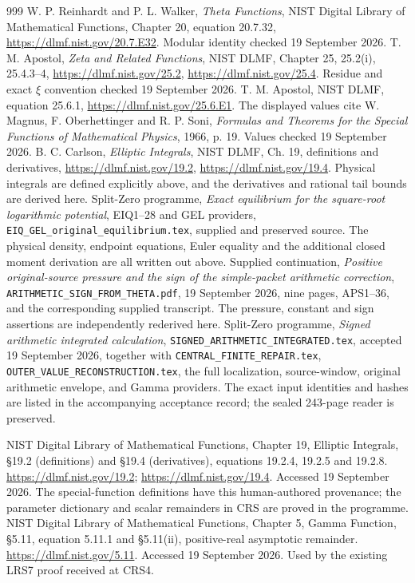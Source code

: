 \documentclass[11pt,a4paper]{article}
\begin{document}
\begin{thebibliography}{999}
 W. P. Reinhardt and P. L. Walker,
\emph{Theta Functions}, NIST Digital Library of Mathematical Functions,
Chapter 20, equation 20.7.32,
\url{https://dlmf.nist.gov/20.7.E32}. Modular identity checked 19 September 2026.
 T. M. Apostol, \emph{Zeta and Related Functions}, NIST DLMF,
Chapter 25, 25.2(i), 25.4.3--4,
\url{https://dlmf.nist.gov/25.2}, \url{https://dlmf.nist.gov/25.4}.
Residue and exact $\xi$ convention checked 19 September 2026.
 T. M. Apostol, NIST DLMF, equation 25.6.1,
\url{https://dlmf.nist.gov/25.6.E1}. The displayed values cite
W. Magnus, F. Oberhettinger and R. P. Soni,
\emph{Formulas and Theorems for the Special Functions of Mathematical Physics},
1966, p. 19. Values checked 19 September 2026.
 B. C. Carlson, \emph{Elliptic Integrals}, NIST DLMF,
Ch. 19, definitions and derivatives, \url{https://dlmf.nist.gov/19.2},
\url{https://dlmf.nist.gov/19.4}. Physical integrals are defined explicitly
above, and the derivatives and rational tail bounds are derived here.
 Split-Zero programme, \emph{Exact equilibrium for the
square-root logarithmic potential}, EIQ1--28 and GEL providers,
\texttt{EIQ\_GEL\_original\_equilibrium.tex}, supplied and preserved source.
The physical density, endpoint equations, Euler equality and the
additional closed moment derivation are all written out above.
 Supplied continuation, \emph{Positive original-source
pressure and the sign of the simple-packet arithmetic correction},
\texttt{ARITHMETIC\_SIGN\_FROM\_THETA.pdf}, 19 September 2026, nine pages,
APS1--36, and the corresponding supplied transcript. The pressure,
constant and sign assertions are independently rederived here.
 Split-Zero programme, \emph{Signed arithmetic integrated
calculation}, \texttt{SIGNED\_ARITHMETIC\_INTEGRATED.tex}, accepted
19 September 2026, together with \texttt{CENTRAL\_FINITE\_REPAIR.tex},
\texttt{OUTER\_VALUE\_RECONSTRUCTION.tex}, the full localization, source-window,
original arithmetic envelope, and Gamma providers. The exact input
identities and hashes are listed in the accompanying acceptance record;
the sealed 243-page reader is preserved.

NIST Digital Library of Mathematical Functions, Chapter 19,
Elliptic Integrals, \S19.2 (definitions) and \S19.4 (derivatives),
equations 19.2.4, 19.2.5 and 19.2.8.
\url{https://dlmf.nist.gov/19.2};
\url{https://dlmf.nist.gov/19.4}.
Accessed 19 September 2026. The special-function definitions have
this human-authored provenance; the parameter dictionary and scalar
remainders in CRS are proved in the programme.
NIST Digital Library of Mathematical Functions, Chapter 5,
Gamma Function, \S5.11, equation 5.11.1 and \S5.11(ii),
positive-real asymptotic remainder.
\url{https://dlmf.nist.gov/5.11}.
Accessed 19 September 2026. Used by the existing LRS7 proof received
at CRS4.


\end{thebibliography}
\end{document}
